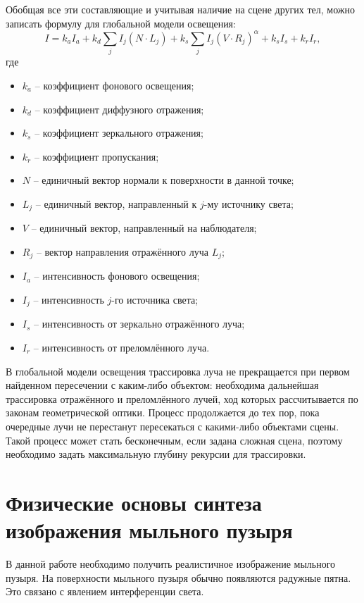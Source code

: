 Обобщая все эти составляющие и учитывая наличие на сцене других тел, можно записать формулу для глобальной модели освещения:
\begin{equation}
	I = k_aI_a + k_d\sum\limits_{j}^{}I_j(N \cdot L_j) + k_s\sum\limits_{j}^{}I_j(V \cdot R_j)^{\alpha}+k_sI_s+k_rI_r,
\end{equation}
где \begin{itemize}
	\item $k_a$ -- коэффициент фонового освещения;
	\item $k_d$ -- коэффициент диффузного отражения;
	\item $k_s$ -- коэффициент зеркального отражения;
	\item $k_r$ -- коэффициент пропускания;
	\item $N$ -- единичный вектор нормали к поверхности в данной точке;
	\item $L_j$ -- единичный вектор, направленный к $j$-му источнику света;
	\item $V$ -- единичный вектор, направленный на наблюдателя;
	\item $R_j$ -- вектор направления отражённого луча $L_j$;
	\item $I_a$ -- интенсивность фонового освещения;
	\item $I_j$ -- интенсивность $j$-го источника света;
	\item $I_s$ --  интенсивность от зеркально отражённого луча;
	\item $I_r$ -- интенсивность от преломлённого луча.
\end{itemize}

В глобальной модели освещения трассировка луча не прекращается при первом найденном пересечении с каким-либо объектом: необходима дальнейшая трассировка отражённого и преломлённого лучей, ход которых рассчитывается по законам геометрической оптики. Процесс продолжается до тех пор, пока очередные лучи не перестанут пересекаться с какими-либо объектами сцены. Такой процесс может стать бесконечным, если задана сложная сцена, поэтому необходимо задать максимальную глубину рекурсии для трассировки.

\section{Физические основы синтеза изображения мыльного пузыря}
В данной работе необходимо получить реалистичное изображение мыльного пузыря. На поверхности мыльного пузыря обычно появляются радужные пятна. Это связано с явлением интерференции света.

